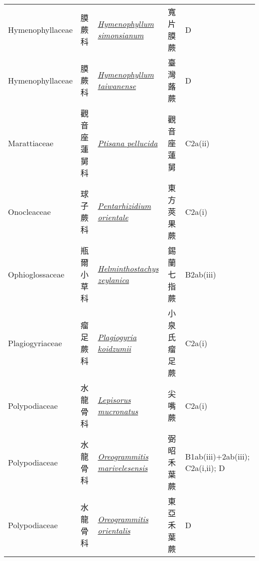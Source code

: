 {\begin{longtable}{p{2.5cm}p{2.5cm}p{4.5cm}p{2.5cm}p{3cm}}
    Hymenophyllaceae & 膜蕨科 & \href{http://www.theplantlist.org/tpl1.1/search?q=Hymenophyllum+simonsianum}{\textit{Hymenophyllum simonsianum} } & 寬片膜蕨 & D \index{Hymenophyllum@\textit{Hymenophyllum}!simonsianum@\textit{simonsianum}}  \index{寬片膜蕨} \\
    Hymenophyllaceae & 膜蕨科 & \href{http://www.theplantlist.org/tpl1.1/search?q=Hymenophyllum+taiwanense}{\textit{Hymenophyllum taiwanense} } & 臺灣蕗蕨 & D \index{Hymenophyllum@\textit{Hymenophyllum}!taiwanense@\textit{taiwanense}}  \index{臺灣蕗蕨} \\
    Marattiaceae & 觀音座蓮舅科 & \href{http://www.theplantlist.org/tpl1.1/search?q=Ptisana+pellucida}{\textit{Ptisana pellucida} } & 觀音座蓮舅 & C2a(ii) \index{Ptisana@\textit{Ptisana}!pellucida@\textit{pellucida}}  \index{觀音座蓮舅} \\
    Onocleaceae & 球子蕨科 & \href{http://www.theplantlist.org/tpl1.1/search?q=Pentarhizidium+orientale}{\textit{Pentarhizidium orientale} } & 東方莢果蕨 & C2a(i) \index{Pentarhizidium@\textit{Pentarhizidium}!orientale@\textit{orientale}}  \index{東方莢果蕨} \\
    Ophioglossaceae & 瓶爾小草科 & \href{http://www.theplantlist.org/tpl1.1/search?q=Helminthostachys+zeylanica}{\textit{Helminthostachys zeylanica} } & 錫蘭七指蕨 & B2ab(iii) \index{Helminthostachys@\textit{Helminthostachys}!zeylanica@\textit{zeylanica}}  \index{錫蘭七指蕨} \\
    Plagiogyriaceae & 瘤足蕨科 & \href{http://www.theplantlist.org/tpl1.1/search?q=Plagiogyria+koidzumii}{\textit{Plagiogyria koidzumii} } & 小泉氏瘤足蕨 & C2a(i) \index{Plagiogyria@\textit{Plagiogyria}!koidzumii@\textit{koidzumii}}  \index{小泉氏瘤足蕨} \\
    Polypodiaceae & 水龍骨科 & \href{http://www.theplantlist.org/tpl1.1/search?q=Lepisorus+mucronatus}{\textit{Lepisorus mucronatus} } & 尖嘴蕨 & C2a(i) \index{Lepisorus@\textit{Lepisorus}!mucronatus@\textit{mucronatus}}  \index{尖嘴蕨} \\
    Polypodiaceae & 水龍骨科 & \href{http://www.theplantlist.org/tpl1.1/search?q=Oreogrammitis+marivelesensis}{\textit{Oreogrammitis marivelesensis} } & 弼昭禾葉蕨 & B1ab(iii)+2ab(iii); C2a(i,ii); D \index{Oreogrammitis@\textit{Oreogrammitis}!marivelesensis@\textit{marivelesensis}}  \index{弼昭禾葉蕨} \\
    Polypodiaceae & 水龍骨科 & \href{http://www.theplantlist.org/tpl1.1/search?q=Oreogrammitis+orientalis}{\textit{Oreogrammitis orientalis} } & 東亞禾葉蕨 & D \index{Oreogrammitis@\textit{Oreogrammitis}!orientalis@\textit{orientalis}}  \index{東亞禾葉蕨} \\

\end{longtable}}
